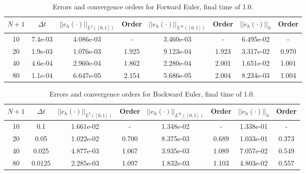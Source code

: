 \documentclass[a4paper, 12pt]{article}
\begin{document}
\begin{table}[H]
\caption{Errors and convergence orders for Forward Euler, final time of 1.0.}
\vspace{0.1in}
\centering
\begin{tabular}{|c|c|c|c| c| c| c| c|}
\hline
 $N+1$  & $\Delta t$ & $||e_h(\cdot)||_{L^2([0,1])}$ & Order  & $||e_h(\cdot)||_{L^\infty([0,1])}$ & Order& $||e_h(\cdot)||_h$& Order \\
 \hline            %
     10  & 7.4e-03 &  4.086e-03 & -     & 3.460e-03 & -     & 6.495e-02 & -     \\
     20  & 1.9e-03 &  1.076e-03 & 1.925 & 9.123e-04 & 1.923 & 3.317e-02 & 0.970 \\
     40  & 4.6e-04 &  2.960e-04 & 1.862 & 2.280e-04 & 2.001 & 1.651e-02 & 1.001 \\
     80  & 1.1e-04 &  6.647e-05 & 2.154 & 5.686e-05 & 2.004 & 8.234e-03 & 1.004 \\
\hline
\end{tabular}
\label{tab:feT1}
\end{table}

\begin{table}[H]
\caption{Errors and convergence orders for Backward Euler, final time of 1.0.}
\vspace{0.1in}
\centering
\begin{tabular}{|c|c|c|c| c| c| c| c|}
\hline
 $N+1$  & $\Delta t$ & $||e_h(\cdot)||_{L^2([0,1])}$ & Order  & $||e_h(\cdot)||_{L^\infty([0,1])}$ & Order& $||e_h(\cdot)||_h$& Order \\
 \hline            %
     10  & 0.1     & 1.661e-02 & -     & 1.348e-02 & -     & 1.338e-01 & -\\
     20  & 0.05    & 1.022e-02 & 0.700 & 8.375e-03 & 0.689 & 1.033e-01 & 0.373\\
     40  & 0.025   & 4.877e-03 & 1.067 & 3.935e-03 & 1.089 & 7.057e-02 & 0.549\\
     80  & 0.0125  & 2.285e-03 & 1.097 & 1.832e-03 & 1.103 & 4.803e-02 & 0.557\\
\hline
\end{tabular}
\label{tab:beT1}
\end{table}
\end{document}
